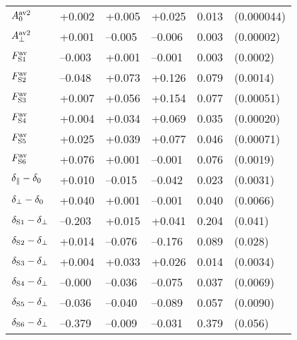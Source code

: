 \begin{table}[htbp]
\begin{tabular}{llllll}
    \hline
    $\magzeroAvSq$      &  +0.002    &  +0.005          &  +0.025          & 0.013  &  (0.000044)                  \\
    $\magperpAvSq$      &  +0.001    & --0.005          & --0.006          & 0.003  &  (0.00002)                   \\
    $\FSAv[1]$          & --0.003    &  +0.001          & --0.001          & 0.003  &  (0.0002)                    \\
    $\FSAv[2]$          & --0.048    &  +0.073          &  +0.126          & 0.079  &  (0.0014)                    \\
    $\FSAv[3]$          &  +0.007    &  +0.056          &  +0.154          & 0.077  &  (0.00051)                   \\
    $\FSAv[4]$          &  +0.004    &  +0.034          &  +0.069          & 0.035  &  (0.00020)                   \\
    $\FSAv[5]$          &  +0.025    &  +0.039          &  +0.077          & 0.046  &  (0.00071)                   \\
    $\FSAv[6]$          &  +0.076    &  +0.001          & --0.001          & 0.076  &  (0.0019)                    \\
    \hline
    $\delpar-\delzero$  &  +0.010    & --0.015          & --0.042          & 0.023  &  (0.0031)                    \\
    $\delperp-\delzero$ &  +0.040    &  +0.001          & --0.001          & 0.040  &  (0.0066)                    \\
    $\delS[1]-\delperp$ & --0.203    &  +0.015          &  +0.041          & 0.204  &  (0.041)                     \\
    $\delS[2]-\delperp$ &  +0.014    & --0.076          & --0.176          & 0.089  &  (0.028)                     \\
    $\delS[3]-\delperp$ &  +0.004    &  +0.033          &  +0.026          & 0.014  &  (0.0034)                    \\
    $\delS[4]-\delperp$ & --0.000    & --0.036          & --0.075          & 0.037  &  (0.0069)                    \\
    $\delS[5]-\delperp$ & --0.036    & --0.040          & --0.089          & 0.057  &  (0.0090)                    \\
    $\delS[6]-\delperp$ & --0.379    & --0.009          & --0.031          & 0.379  &  (0.056)                     \\
    \hline
  \end{tabular}
\end{table}
